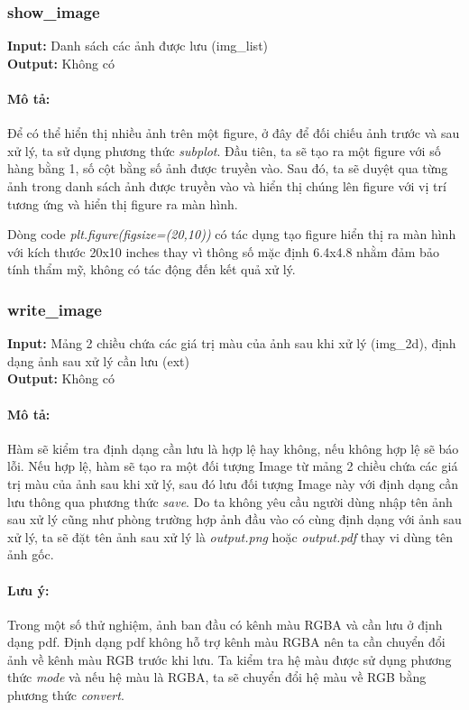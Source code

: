 \documentclass{article}
\begin{document}
\subsubsection{show\_image}
\textbf{Input:} Danh sách các ảnh được lưu (img\_list) \\
\textbf{Output:} Không có

\paragraph*{Mô tả:}
Để có thể hiển thị nhiều ảnh trên một figure, ở đây để đối chiếu ảnh trước và sau xử lý, ta sử dụng phương thức \textit{subplot}. Đầu tiên, ta sẽ tạo ra một figure với số hàng bằng 1, số cột bằng số ảnh được truyền vào. Sau đó, ta sẽ duyệt qua từng ảnh trong danh sách ảnh được truyền vào và hiển thị chúng lên figure với vị trí tương ứng và hiển thị figure ra màn hình.

Dòng code \textit{plt.figure(figsize=(20,10))} có tác dụng tạo figure hiển thị ra màn hình với kích thước 20x10 inches thay vì thông số mặc định 6.4x4.8 nhằm đảm bảo tính thẩm mỹ, không có tác động đến kết quả xử lý.

\subsubsection{write\_image}
\textbf{Input:} Mảng 2 chiều chứa các giá trị màu của ảnh sau khi xử lý (img\_2d), định dạng ảnh sau xử lý cần lưu (ext)\\
\textbf{Output:} Không có

\paragraph*{Mô tả:}
Hàm sẽ kiểm tra định dạng cần lưu là hợp lệ hay không, nếu không hợp lệ sẽ báo lỗi. Nếu hợp lệ, hàm sẽ tạo ra một đối tượng Image từ mảng 2 chiều chứa các giá trị màu của ảnh sau khi xử lý, sau đó lưu đối tượng Image này với định dạng cần lưu thông qua phương thức \textit{save}. Do ta không yêu cầu người dùng nhập tên ảnh sau xử lý cũng như phòng trường hợp ảnh đầu vào có cùng định dạng với ảnh sau xử lý, ta sẽ đặt tên ảnh sau xử lý là \textit{output.png} hoặc \textit{output.pdf} thay vi dùng tên ảnh gốc.

\paragraph*{Lưu ý:}
Trong một số thử nghiệm, ảnh ban đầu có kênh màu RGBA và cần lưu ở định dạng pdf. Định dạng pdf không hỗ trợ kênh màu RGBA nên ta cần chuyển đổi ảnh về kênh màu RGB trước khi lưu. Ta kiểm tra hệ màu được sử dụng phương thức \textit{mode} và nếu hệ màu là RGBA, ta sẽ chuyển đổi hệ màu về RGB bằng phương thức \textit{convert}.
\end{document}
